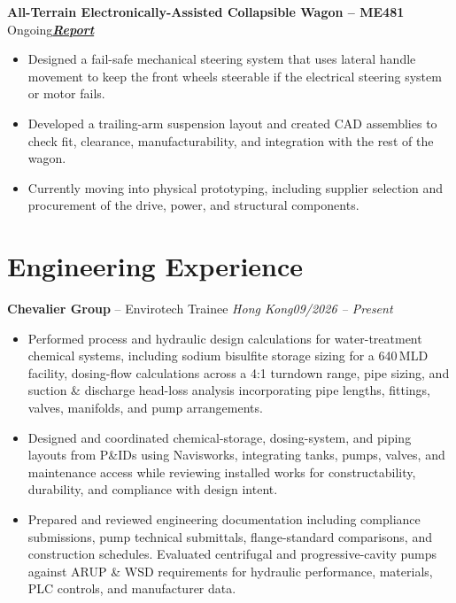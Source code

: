 \documentclass[letterpaper,10pt]{article}
\newcommand{\heading}[2]{\par\vspace{5pt}#1\hfill#2\par}
\newcommand{\link}[2]{\href{#1}{\textbf{\textit{#2}}}}
\begin{document}
\heading{\textbf{All-Terrain Electronically-Assisted Collapsible Wagon -- ME481} \textbar{} Ongoing}{\link{https://drive.google.com/file/d/1iHX16wDuQlWoo2We_pLd0g6E9CP2kmpn/view?usp=sharing}{Report}}
\begin{itemize}
  \item Designed a fail-safe mechanical steering system that uses lateral handle movement to keep the front wheels steerable if the electrical steering system or motor fails.
  \item Developed a trailing-arm suspension layout and created CAD assemblies to check fit, clearance, manufacturability, and integration with the rest of the wagon.
  \item Currently moving into physical prototyping, including supplier selection and procurement of the drive, power, and structural components.
\end{itemize}

\section{Engineering Experience}
\heading{\textbf{Chevalier Group} -- Envirotech Trainee \textbar{} \textit{Hong Kong}}{\textit{09/2026 -- Present}}
\begin{itemize}
  \item Performed process and hydraulic design calculations for water-treatment chemical systems, including sodium bisulfite storage sizing for a 640\,MLD facility, dosing-flow calculations across a 4:1 turndown range, pipe sizing, and suction \& discharge head-loss analysis incorporating pipe lengths, fittings, valves, manifolds, and pump arrangements.
  \item Designed and coordinated chemical-storage, dosing-system, and piping layouts from P\&IDs using Navisworks, integrating tanks, pumps, valves, and maintenance access while reviewing installed works for constructability, durability, and compliance with design intent.
  \item Prepared and reviewed engineering documentation including compliance submissions, pump technical submittals, flange-standard comparisons, and construction schedules. Evaluated centrifugal and progressive-cavity pumps against ARUP \& WSD requirements for hydraulic performance, materials, PLC controls, and manufacturer data.
\end{itemize}
\end{document}
